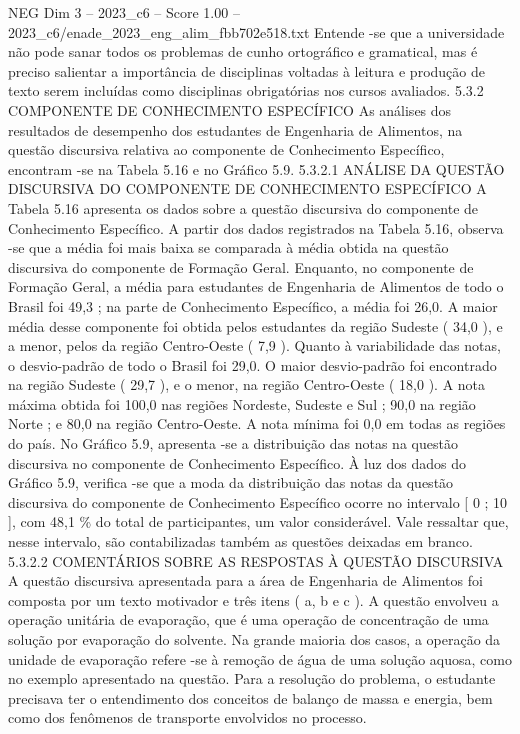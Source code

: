 \begin{textsample}{NEG Dim 3 – 2023\_c6 – Score 1.00 – 2023\_c6/enade\_2023\_eng\_alim\_fbb702e518.txt}
Entende -se que a universidade não pode sanar todos os problemas de cunho ortográfico e gramatical, mas é preciso salientar a importância de disciplinas voltadas à leitura e produção de texto serem incluídas como disciplinas obrigatórias nos cursos avaliados. 5.3.2 COMPONENTE DE CONHECIMENTO ESPECÍFICO As análises dos resultados de desempenho dos estudantes de Engenharia de Alimentos, na questão discursiva relativa ao componente de Conhecimento Específico, encontram -se na Tabela 5.16 e no Gráfico 5.9. 5.3.2.1 ANÁLISE DA QUESTÃO DISCURSIVA DO COMPONENTE DE CONHECIMENTO ESPECÍFICO A Tabela 5.16 apresenta os dados sobre a questão discursiva do componente de Conhecimento Específico.
A partir dos dados registrados na Tabela 5.16, observa -se que a média foi mais baixa se comparada à média obtida na questão discursiva do componente de Formação Geral.
Enquanto, no componente de Formação Geral, a média para estudantes de Engenharia de Alimentos de todo o Brasil foi 49,3 ; na parte de Conhecimento Específico, a média foi 26,0.
A maior média desse componente foi obtida pelos estudantes da região Sudeste ( 34,0 ), e a menor, pelos da região Centro-Oeste ( 7,9 ).
Quanto à variabilidade das notas, o desvio-padrão de todo o Brasil foi 29,0.
O maior desvio-padrão foi encontrado na região Sudeste ( 29,7 ), e o menor, na região Centro-Oeste ( 18,0 ).
A nota máxima obtida foi 100,0 nas regiões Nordeste, Sudeste e Sul ; 90,0 na região Norte ; e 80,0 na região Centro-Oeste.
A nota mínima foi 0,0 em todas as regiões do país.
No Gráfico 5.9, apresenta -se a distribuição das notas na questão discursiva no componente de Conhecimento Específico.
À luz dos dados do Gráfico 5.9, verifica -se que a moda da distribuição das notas da questão discursiva do componente de Conhecimento Específico ocorre no intervalo [ 0 ; 10 ], com 48,1 \% do total de participantes, um valor considerável.
Vale ressaltar que, nesse intervalo, são contabilizadas também as questões deixadas em branco. 5.3.2.2 COMENTÁRIOS SOBRE AS RESPOSTAS À QUESTÃO DISCURSIVA A questão discursiva apresentada para a área de Engenharia de Alimentos foi composta por um texto motivador e três itens ( a, b e c ).
A questão envolveu a operação unitária de evaporação, que é uma operação de concentração de uma solução por evaporação do solvente.
Na grande maioria dos casos, a operação da unidade de evaporação refere -se à remoção de água de uma solução aquosa, como no exemplo apresentado na questão.
Para a resolução do problema, o estudante precisava ter o entendimento dos conceitos de balanço de massa e energia, bem como dos fenômenos de transporte envolvidos no processo.

\end{textsample}
